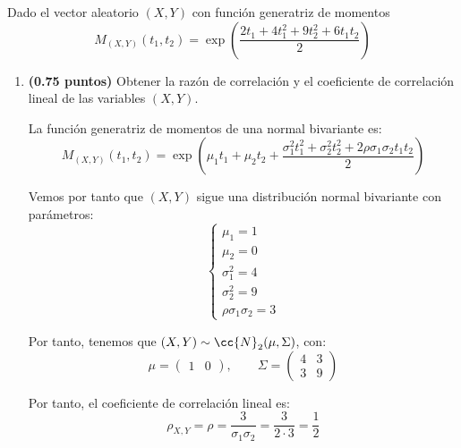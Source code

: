 \documentclass[12pt]{article}
\begin{document}
    \begin{ejercicio}[2.5 puntos]
        Dado el vector aleatorio $(X,Y)$ con función generatriz de momentos
        \begin{equation*}
            M_{(X,Y)}(t_1,t_2) = \exp\left(\dfrac{2t_1 + 4t_1^2 + 9t_2^2 + 6t_1t_2}{2}\right)
        \end{equation*}
        \begin{enumerate}
            \item \textbf{(0.75 puntos)} Obtener la razón de correlación y el coeficiente de correlación lineal de las variables $(X,Y)$.
            
            La función generatriz de momentos de una normal bivariante es:
            \begin{equation*}
                M_{(X,Y)}(t_1,t_2) = \exp\left(\mu_1t_1+\mu_2t_2+\dfrac{\sigma_{1}^2t_1^2+\sigma_{2}^2t_2^2+2\rho\sigma_1\sigma_2 t_1t_2}{2}\right)
            \end{equation*}

            Vemos por tanto que $(X,Y)$ sigue una distribución normal bivariante con parámetros:
            \begin{equation*}
                \begin{cases}
                    \mu_1 = 1\\
                    \mu_2 = 0\\
                    \sigma_1^2 = 4\\
                    \sigma_2^2 = 9\\
                    \rho\sigma_1\sigma_2 = 3
                \end{cases}
            \end{equation*}

            Por tanto, tenemos que $(X,Y)\sim \cc{N}_2(\mu,\Sigma)$, con:
            \begin{equation*}
                \mu = \begin{pmatrix}1&0\end{pmatrix},\qquad
                \Sigma = \begin{pmatrix}4 & 3\\3 & 9\end{pmatrix}
            \end{equation*}

            Por tanto, el coeficiente de correlación lineal es:
            \begin{equation*}
                \rho_{X,Y} =\rho =  \dfrac{3}{\sigma_1\sigma_2} = \dfrac{3}{2\cdot 3} = \dfrac{1}{2}
            \end{equation*}


\end{enumerate}
\end{ejercicio}
\end{document}
